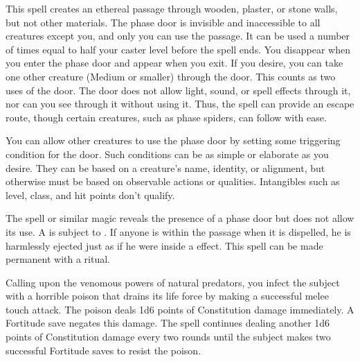 \begin{spelleffect}
  This spell creates an ethereal passage through wooden, plaster, or stone walls, but not other materials. The phase door is invisible and inaccessible to all creatures except you, and only you can use the passage. It can be used a number of times equal to half your caster level before the spell ends. You disappear when you enter the phase door and appear when you exit. If you desire, you can take one other creature (Medium or smaller) through the door. This counts as two uses of the door. The door does not allow light, sound, or spell effects through it, nor can you see through it without using it. Thus, the spell can provide an escape route, though certain creatures, such as phase spiders, can follow with ease.
  \par You can allow other creatures to use the phase door by setting some triggering condition for the door. Such conditions can be as simple or elaborate as you desire. They can be based on a creature's name, identity, or alignment, but otherwise must be based on observable actions or qualities. Intangibles such as level, class, and hit points don't qualify.
\end{spelleffect}
\begin{spellnotes}
  The  spell or similar magic reveals the presence of a phase door but does not allow its use. A  is subject to . If anyone is within the passage when it is dispelled, he is harmlessly ejected just as if he were inside a  effect. This spell can be made permanent with a  ritual.
\end{spellnotes}

\begin{spelleffect}
  Calling upon the venomous powers of natural predators, you infect the subject with a horrible poison that drains its life force by making a successful melee touch attack. The poison deals 1d6 points of Constitution damage immediately. A Fortitude save negates this damage. The spell continues dealing another 1d6 points of Constitution damage every two rounds until the subject makes two successful Fortitude saves to resist the poison.
\end{spelleffect}

